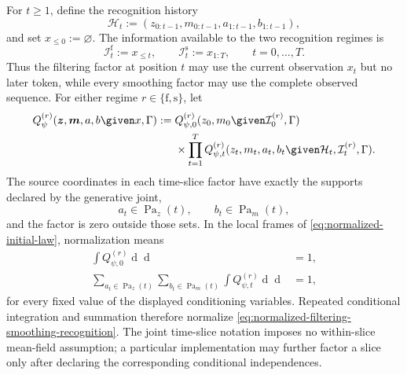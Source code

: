For $t\geq1$, define the recognition history
\begin{equation}
\mathcal H_t
:=(z_{0:t-1},m_{0:t-1},a_{1:t-1},b_{1:t-1}),
\label{eq:recognition-history}
\end{equation}
and set $x_{\leq0}:=\varnothing$.  The information available to the two recognition regimes is
\begin{equation}
\mathcal I_t^{\mathrm f}:=x_{\leq t},
\qquad
\mathcal I_t^{\mathrm s}:=x_{1:T},
\qquad t=0,\ldots,T.
\label{eq:filtering-smoothing-information}
\end{equation}
Thus the filtering factor at position $t$ may use the current observation $x_t$ but no later token, while every smoothing factor may use the complete observed sequence.  For either regime $r\in\{\mathrm f,\mathrm s\}$, let
\begin{equation}
\begin{aligned}
Q_\psi^{(r)}(\boldsymbol z,\boldsymbol m,a,b\given x,\Gamma)
:={}&Q_{\psi,0}^{(r)}
(z_0,m_0\given\mathcal I_0^{(r)},\Gamma)\\
&\times\prod_{t=1}^{T}
Q_{\psi,t}^{(r)}
(z_t,m_t,a_t,b_t\given
\mathcal H_t,\mathcal I_t^{(r)},\Gamma).
\end{aligned}
\label{eq:normalized-filtering-smoothing-recognition}
\end{equation}
The source coordinates in each time-slice factor have exactly the supports declared by the generative joint,
\begin{equation}
a_t\in\operatorname{Pa}_z(t),
\qquad
b_t\in\operatorname{Pa}_m(t),
\label{eq:recognition-source-supports}
\end{equation}
and the factor is zero outside those sets.  In the local frames of \cref{eq:normalized-initial-law}, normalization means
\begin{equation}
\begin{aligned}
\int Q_{\psi,0}^{(r)}
\mathop{\mathrm d\lambda_{z,0}}
\mathop{\mathrm d\lambda_{m,0}}&=1,\\
\sum_{a_t\in\operatorname{Pa}_z(t)}
\sum_{b_t\in\operatorname{Pa}_m(t)}
\int Q_{\psi,t}^{(r)}
\mathop{\mathrm d\lambda_{z,t}}
\mathop{\mathrm d\lambda_{m,t}}&=1,
\end{aligned}
\label{eq:recognition-factor-normalization}
\end{equation}
for every fixed value of the displayed conditioning variables.  Repeated conditional integration and summation therefore normalize \cref{eq:normalized-filtering-smoothing-recognition}.  The joint time-slice notation imposes no within-slice mean-field assumption; a particular implementation may further factor a slice only after declaring the corresponding conditional independences.

